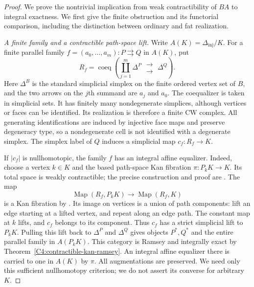 \begin{proof}
We prove the nontrivial implication from weak contractibility of $BA$
to integral exactness. We first give the finite obstruction and its
functorial comparison, including the distinction between ordinary
and fat realization.

\emph{A finite family and a contractible path-space lift.}
Write $A(K)=\Delta_{\mathrm{inj}}/K$. For a finite parallel family
$f=(a_0,\ldots,a_m):P\rightrightarrows Q$ in $A(K)$, put
\[
 R_f=\operatorname{coeq}\left(
 \coprod_{j=1}^{m}\Delta^{P}\;
 \substack{\longrightarrow\\[-5pt]\longrightarrow}\;
 \Delta^{Q}\right).
 \tag{KC.1}
\]
Here $\Delta^B$ is the standard simplicial simplex on the finite
ordered vertex set of $B$, and the two arrows on the $j$th summand
are $a_j$ and $a_0$. The coequalizer is taken in simplicial sets.
It has finitely many nondegenerate simplices, although vertices or
faces can be identified. Its realization is therefore a finite CW
complex. All generating identifications are induced by injective
face maps and preserve degeneracy type, so a nondegenerate cell is
not identified with a degenerate simplex. The simplex label of $Q$ induces a simplicial map
$c_f:R_f\to K$.

If $|c_f|$ is nullhomotopic, the family $f$ has an integral affine
equalizer. Indeed, choose a vertex $k\in K$ and the based path-space
Kan fibration $\pi:P_kK\to K$. Its total space is weakly contractible;
the precise construction and proof are
\cite[Lemma I.7.5, pp.~30--31]{ABGoerssJardine}. The map
\[
 \operatorname{Map}(R_f,P_kK)\longrightarrow
 \operatorname{Map}(R_f,K)
\]
is a Kan fibration by \cite[Proposition I.5.2 and Corollary I.5.3]{ABGoerssJardine}.
Its image on vertices is a union of path components: lift an edge
starting at a lifted vertex, and repeat along an edge path. The
constant map at $k$ lifts, and $c_f$ belongs to its component.
Thus $c_f$ has a strict simplicial lift to $P_kK$. Pulling this lift
back to $\Delta^P$ and $\Delta^Q$ gives objects $P^*,Q^*$ and the
entire parallel family in $A(P_kK)$. This category is Ramsey and
integrally exact by Theorem~\ref{C4:contractible-kan-ramsey}.
An integral affine equalizer there is carried to one in $A(K)$ by
$\pi$. All augmentations are preserved. We need only this sufficient
nullhomotopy criterion; we do not assert its converse for arbitrary
$K$.


\end{proof}
